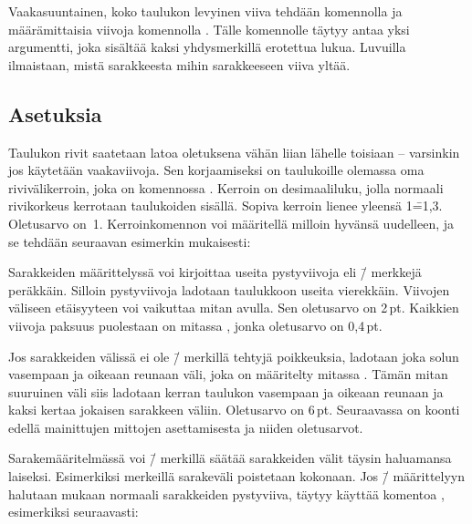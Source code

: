 Vaakasuuntainen, koko taulukon levyinen viiva tehdään komennolla
 ja määrämittaisia viivoja komennolla .
Tälle komennolle täytyy antaa yksi argumentti, joka sisältää kaksi
yhdysmerkillä erotettua lukua. Luvuilla ilmaistaan, mistä sarakkeesta
mihin sarakkeeseen viiva yltää.

\subsection{Asetuksia}

Taulukon rivit saatetaan latoa oletuksena vähän liian lähelle toisiaan
-- varsinkin jos käytetään vaakaviivoja. Sen korjaamiseksi on
taulukoille olemassa oma rivivälikerroin, joka on komennossa
. Kerroin on desimaaliluku, jolla normaali
rivikorkeus kerrotaan taulukoiden sisällä. Sopiva kerroin lienee yleensä
1\==1,3. Oletusarvo on~1. Kerroinkomennon voi määritellä milloin hyvänsä
uudelleen, ja se tehdään seuraavan esimerkin mukaisesti:

\begin{koodilohkosis}
\renewcommand{\arraystretch}{1.3}
\end{koodilohkosis}

Sarakkeiden määrittelyssä voi kirjoittaa useita pystyviivoja eli
\koodi{|}\=/ merkkejä peräkkäin. Silloin pystyviivoja ladotaan
taulukkoon useita vierekkäin. Viivojen väliseen etäisyyteen voi
vaikuttaa mitan  avulla. Sen oletusarvo on 2\,pt.
Kaikkien viivoja paksuus puolestaan on mitassa ,
jonka oletusarvo on 0,4\,pt.

Jos sarakkeiden välissä ei ole \=/ merkillä tehtyjä
poikkeuksia, ladotaan joka solun vasempaan ja oikeaan reunaan väli, joka
on määritelty mitassa . Tämän mitan suuruinen väli
siis ladotaan kerran taulukon vasempaan ja oikeaan reunaan ja kaksi
kertaa jokaisen sarakkeen väliin. Oletusarvo on 6\,pt. Seuraavassa on
koonti edellä mainittujen mittojen asettamisesta ja niiden oletusarvot.

\begin{koodilohkosis}
\setlength{\doublerulesep}{2pt}
\setlength{\arrayrulewidth}{.4pt}
\setlength{\tabcolsep}{6pt}
\end{koodilohkosis}

Sarakemääritelmässä voi \=/ merkillä säätää sarakkeiden välit
täysin haluamansa laiseksi. Esimerkiksi merkeillä 
sarakeväli poistetaan kokonaan. Jos \=/ määrittelyyn
halutaan mukaan normaali sarakkeiden pystyviiva, täytyy käyttää komentoa
, esimerkiksi seuraavasti:

